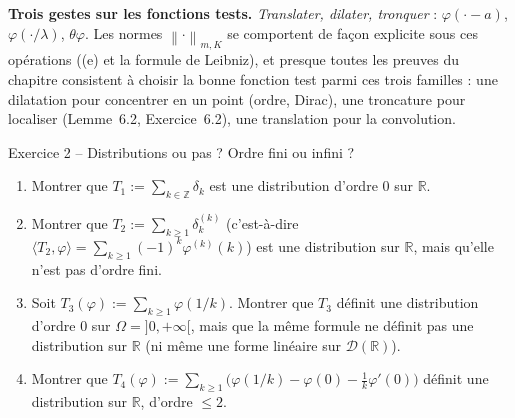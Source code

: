 \documentclass[11pt,a4paper]{article}
\newcommand{\R}{\mathbb{R}}
\newcommand{\Z}{\mathbb{Z}}
\newcommand{\norm}[1]{\left\|#1\right\|}
\newcommand{\ie}{c'est-à-dire}
\newcommand{\D}{\mathcal{D}}
\theoremstyle{definition}
\begin{document}
\begin{pointcle}
\textbf{Trois gestes sur les fonctions tests.} \emph{Translater, dilater, tronquer} : $\varphi(\cdot-a)$, $\varphi(\cdot/\lambda)$, $\theta\varphi$. Les normes $\norm\cdot_{m,K}$ se comportent de façon explicite sous ces opérations ((e) et la formule de Leibniz), et presque toutes les preuves du chapitre consistent à choisir la bonne fonction test parmi ces trois familles : une dilatation pour concentrer en un point (ordre, Dirac), une troncature pour localiser (Lemme~6.2, Exercice~6.2), une translation pour la convolution.
\end{pointcle}

\begin{exo}{Exercice 2 -- Distributions ou pas ? Ordre fini ou infini ?}
\begin{enumerate}[label=(\alph*)]
  \item Montrer que $T_1:=\sum_{k\in\Z}\delta_k$ est une distribution d'ordre $0$ sur $\R$.
  \item Montrer que $T_2:=\sum_{k\ge1}\delta_k^{(k)}$ (\ie\ $\langle T_2,\varphi\rangle=\sum_{k\ge1}(-1)^k\varphi^{(k)}(k)$) est une distribution sur $\R$, mais qu'elle n'est pas d'ordre fini.
  \item Soit $T_3(\varphi):=\sum_{k\ge1}\varphi(1/k)$. Montrer que $T_3$ définit une distribution d'ordre $0$ sur $\Omega=]0,+\infty[$, mais que la même formule ne définit pas une distribution sur $\R$ (ni même une forme linéaire sur $\D(\R)$).
  \item Montrer que $T_4(\varphi):=\sum_{k\ge1}\big(\varphi(1/k)-\varphi(0)-\tfrac1k\varphi'(0)\big)$ définit une distribution sur $\R$, d'ordre $\le2$.
\end{enumerate}
\end{exo}
\end{document}
